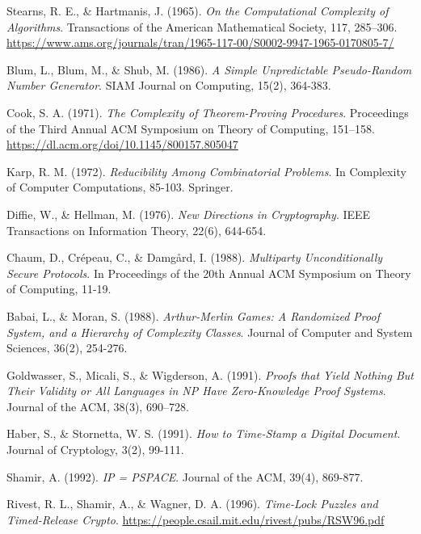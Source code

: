 \documentclass[12pt]{report}
\begin{document}
\begin{thebibliography}{9}

Stearns, R. E., \& Hartmanis, J. (1965). \textit{On the Computational Complexity of Algorithms}. Transactions of the American Mathematical Society, 117, 285–306. \url{https://www.ams.org/journals/tran/1965-117-00/S0002-9947-1965-0170805-7/}

Blum, L., Blum, M., \& Shub, M. (1986). \textit{A Simple Unpredictable Pseudo-Random Number Generator}. SIAM Journal on Computing, 15(2), 364-383.

Cook, S. A. (1971). \textit{The Complexity of Theorem-Proving Procedures}. Proceedings of the Third Annual ACM Symposium on Theory of Computing, 151–158. \url{https://dl.acm.org/doi/10.1145/800157.805047}

Karp, R. M. (1972). \textit{Reducibility Among Combinatorial Problems}. In Complexity of Computer Computations, 85-103. Springer.

Diffie, W., \& Hellman, M. (1976). \textit{New Directions in Cryptography}. IEEE Transactions on Information Theory, 22(6), 644-654.

Chaum, D., Crépeau, C., \& Damgård, I. (1988). \textit{Multiparty Unconditionally Secure Protocols}. In Proceedings of the 20th Annual ACM Symposium on Theory of Computing, 11-19.

Babai, L., \& Moran, S. (1988). \textit{Arthur-Merlin Games: A Randomized Proof System, and a Hierarchy of Complexity Classes}. Journal of Computer and System Sciences, 36(2), 254-276.

Goldwasser, S., Micali, S., \& Wigderson, A. (1991). \textit{Proofs that Yield Nothing But Their Validity or All Languages in NP Have Zero-Knowledge Proof Systems}. Journal of the ACM, 38(3), 690–728.

Haber, S., \& Stornetta, W. S. (1991). \textit{How to Time-Stamp a Digital Document}. Journal of Cryptology, 3(2), 99-111.

Shamir, A. (1992). \textit{IP = PSPACE}. Journal of the ACM, 39(4), 869-877.

Rivest, R. L., Shamir, A., \& Wagner, D. A. (1996). \textit{Time-Lock Puzzles and Timed-Release Crypto}. \url{https://people.csail.mit.edu/rivest/pubs/RSW96.pdf}


\end{thebibliography}
\end{document}
